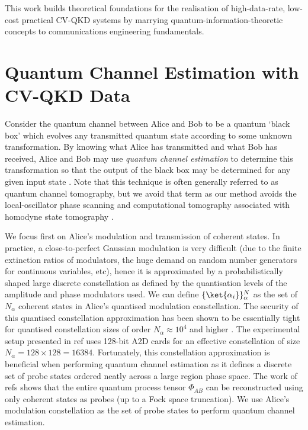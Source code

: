 ﻿\documentclass[12pt]{article}
\begin{document}
This work builds theoretical foundations for the realisation of high-data-rate, low-cost practical CV-QKD systems by marrying quantum-information-theoretic concepts to communications engineering fundamentals.

\newpage
\singlespacing



\appendix

\section{Quantum Channel Estimation with CV-QKD Data}\label{app: channel estimation with cv-qkd data}

Consider the quantum channel between Alice and Bob to be a quantum `black box' which evolves any transmitted quantum state according to some unknown transformation. By knowing what Alice has transmitted and what Bob has received, Alice and Bob may use \textit{quantum channel estimation} to determine this transformation so that the output of the black box may be determined for any given input state \cite{Mohseni-2008}. Note that this technique is often generally referred to as quantum channel tomography, but we avoid that term as our method avoids the local-oscillator phase scanning and computational tomography associated with homodyne state tomography \cite{Lvovsky-2009}.

We focus first on Alice's modulation and transmission of coherent states. In practice, a close-to-perfect Gaussian modulation is very difficult (due to the finite extinction ratios of modulators, the huge demand on random number generators for continuous variables, etc), hence it is approximated by a probabilistically shaped large discrete constellation as defined by the quantisation levels of the amplitude and phase modulators used. We can define $\{\ket{\alpha_i}\}^N_\alpha$ as the set of $N_\alpha$ coherent states in Alice's quantised modulation constellation. The security of this quantised constellation approximation has been shown to be essentially tight for quantised constellation sizes of order $N_\alpha \approx 10^4$ and higher \cite{Kaur-2021, Denys-2021}. The experimental setup presented in ref \cite{Weerasinghe-2023} uses 128-bit A2D cards for an effective constellation of size $N_\alpha = 128 \times 128 = 16384$. Fortunately, this constellation approximation is beneficial when performing quantum channel estimation as it defines a discrete set of probe states ordered neatly across a large region phase space. The work of refs \cite{Lobino-2008, Rahimi-Keshari-2011} shows that the entire quantum process tensor $\Phi_{AB}$ can be reconstructed using only coherent states as probes (up to a Fock space truncation). We use Alice's modulation constellation as the set of probe states to perform quantum channel estimation.
\end{document}
